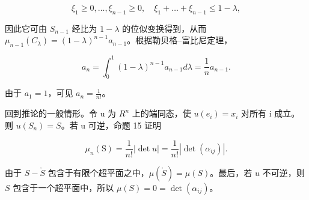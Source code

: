 \[
\xi_ {1} \geqslant 0, \dots , \xi_ {n - 1} \geqslant 0, \quad \xi_ {1} + \dots + \xi_ {n - 1} \leqslant 1 - \lambda ,
\]

因此它可由 \(S_{n-1}\) 经比为 \(1-\lambda\) 的位似变换得到，从而 \(\mu_{n-1}(C_{\lambda})=(1-\lambda)^{n-1}a_{n-1}\)。根据勒贝格--富比尼定理，

\[
a _ {n} = \int_ {0} ^ {1} (1 - \lambda) ^ {n - 1} a _ {n - 1} d \lambda = \frac {1}{n} a _ {n - 1}.
\]

由于 \(a_1 = 1\)，可见 \(a_n = \frac{1}{n!}\)。

回到推论的一般情形。令 u 为 \(R^{n}\) 上的端同态，使 \(u(e_{i}) = x_{i}\) 对所有 i 成立。则 \(u(S_{n}) = S\)。若 u 可逆，命题 15 证明

\[
\mu_ {n} (\mathrm{S}) = \frac {1}{n !} | \det u | = \frac {1}{n !} | \det (\alpha_ {i j}) |.
\]

由于 \(S - \mathring{S}\) 包含于有限个超平面之中，\(\mu(\mathring{S}) = \mu(S)\)。最后，若 \(u\) 不可逆，则 \(S\) 包含于一个超平面中，所以 \(\mu(S) = 0 = \det(\alpha_{ij})\)。

